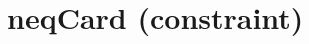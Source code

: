 \label{neqcard}
\hypertarget{neqcard}{}

\section{neqCard (constraint)}\label{neqcard:neqcardconstraint}\hypertarget{neqcard:neqcardconstraint}{}
